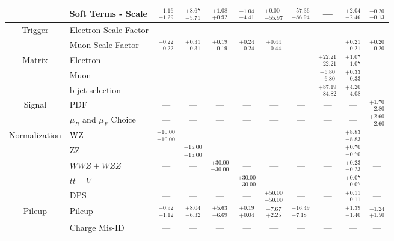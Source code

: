 \begin{tabular}{|cl||ccccccc|c||c|}
\cline{2-11}
&Soft Terms - Scale &  $^{+1.16}_{-1.29}$  &  $^{+8.67}_{-5.71}$  &  $^{+1.08}_{+0.92}$  &  $^{-1.04}_{-4.41}$  &  $^{+0.00}_{-55.97}$  &  $^{+57.36}_{-86.94}$  & --- &  $^{+2.04}_{-2.46}$  &  $^{-0.20}_{-0.13}$ \\ 
\hline
\multirow{2}{*}{Trigger}
&Electron Scale Factor & --- & --- & --- & --- & --- & --- & --- & --- & ---\\ 
\cline{2-11}
&Muon Scale Factor &  $^{+0.22}_{-0.22}$  &  $^{+0.31}_{-0.31}$  &  $^{+0.19}_{-0.19}$  &  $^{+0.24}_{-0.24}$  &  $^{+0.44}_{-0.44}$  & --- & --- &  $^{+0.21}_{-0.21}$  &  $^{+0.20}_{-0.20}$ \\ 
\hline
\multirow{2}{*}{Matrix}
&Electron & --- & --- & --- & --- & --- & --- &  $^{+22.21}_{-22.21}$  &  $^{+1.07}_{-1.07}$  & ---\\ 
\cline{2-11}
\multirow{2}{*}{Method}
&Muon & --- & --- & --- & --- & --- & --- &  $^{+6.80}_{-6.80}$  &  $^{+0.33}_{-0.33}$  & ---\\ 
\cline{2-11}
&b-jet selection & --- & --- & --- & --- & --- & --- &  $^{+87.19}_{-84.82}$  &  $^{+4.20}_{-4.08}$  & ---\\ 
\hline
\multirow{2}{*}{Signal}
&PDF & --- & --- & --- & --- & --- & --- & --- & --- &  $^{+1.70}_{-2.80}$ \\ 
\cline{2-11}
&$\mu_{R}$ and $\mu_{F}$ Choice & --- & --- & --- & --- & --- & --- & --- & --- &  $^{+2.60}_{-2.60}$ \\ 
\hline
\multirow{5}{*}{Normalization}
&WZ &  $^{+10.00}_{-10.00}$  & --- & --- & --- & --- & --- & --- &  $^{+8.83}_{-8.83}$  & ---\\ 
\cline{2-11}
&ZZ & --- &  $^{+15.00}_{-15.00}$  & --- & --- & --- & --- & --- &  $^{+0.70}_{-0.70}$  & ---\\ 
\cline{2-11}
&$WWZ+WZZ$ & --- & --- &  $^{+30.00}_{-30.00}$  & --- & --- & --- & --- &  $^{+0.23}_{-0.23}$  & ---\\ 
\cline{2-11}
&$t\overline{t}+V$ & --- & --- & --- &  $^{+30.00}_{-30.00}$  & --- & --- & --- &  $^{+0.07}_{-0.07}$  & ---\\ 
\cline{2-11}
&DPS & --- & --- & --- & --- &  $^{+50.00}_{-50.00}$  & --- & --- &  $^{+0.11}_{-0.11}$  & ---\\ 
\hline
\multirow{1}{*}{Pileup}
&Pileup &  $^{+0.92}_{-1.12}$  &  $^{+8.04}_{-6.32}$  &  $^{+5.63}_{-6.69}$  &  $^{+0.19}_{+0.04}$  &  $^{-7.67}_{+2.25}$  &  $^{+16.49}_{-7.18}$  & --- &  $^{+1.39}_{-1.40}$  &  $^{-1.24}_{+1.50}$ \\ 
\hline
&Charge Mis-ID & --- & --- & --- & --- & --- & --- & --- & --- & ---\\ 

\end{tabular}
